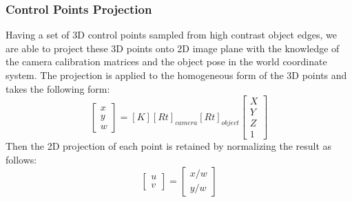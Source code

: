 \documentclass{article}
\begin{document}
\subsubsection{Control Points Projection}
Having a set of 3D control points sampled from high contrast object edges, we are able to project these 3D points onto 2D image plane with the knowledge of the camera calibration matrices and the object pose in the world coordinate system. The projection is applied to the homogeneous form of the 3D points and takes the following form:
\begin{equation}
\begin{bmatrix}
x \\ y \\ w 
\end{bmatrix} = [K][Rt]_{camera} [Rt]_{object} \begin{bmatrix}
X \\ Y \\ Z \\ 1
\end{bmatrix}
\end{equation}
Then the 2D projection of each point is retained by normalizing the result as follows:
\begin{equation}
\begin{bmatrix}
u \\ v
\end{bmatrix} = \begin{bmatrix}
x/w \\ y/w
\end{bmatrix}
\end{equation}
\end{document}

